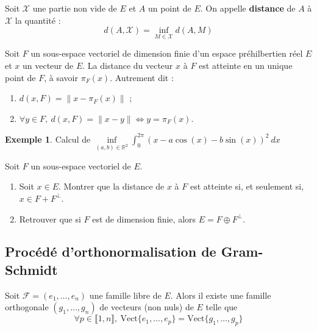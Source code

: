 \documentclass[french]{article}
\newcommand{\R}{\mathbb{R}}
\theoremstyle{plain}
\theoremstyle{definition}
\newtheorem*{ex}{Exemple}
\theoremstyle{remark}
\begin{document}
\begin{dfn}
	Soit $\mathcal{X}$ une partie non vide de $E$ et $A$ un point de $E$. On appelle \textbf{distance} de $A$ à $\mathcal{X}$ la quantité : $$d(A,\mathcal{X})=\underset{M\in\mathcal{X}}{\inf}d(A,M)$$
\end{dfn}

\begin{thm}
	Soit $F$ un sous-espace vectoriel de dimension finie d'un espace préhilbertien réel $E$ et $x$ un vecteur de $E$. La distance du vecteur $x$ à $F$ est atteinte en un unique point de $F$, à savoir $\pi_F(x)$. Autrement dit : 
	\begin{enumerate}
		\item $d(x,F)=\lVert x-\pi_F(x)\rVert$ ;
		\item $\forall y\in F,\ d(x,F)=\lVert x-y\rVert\iff y=\pi_F(x)$.
	\end{enumerate}
\end{thm}

\begin{ex}
	Calcul de $\displaystyle\underset{(a,b)\in\R^2}{\inf}\int_{0}^{2\pi}(x-a\cos(x)-b\sin(x))^2\ dx$
\end{ex}

\begin{exo}
	Soit $F$ un sous-espace vectoriel de $E$.
	\begin{enumerate}
		\item Soit $x\in E$. Montrer que la distance de $x$ à $F$ est atteinte si, et seulement si, $x\in F+F^\bot$.
		\item Retrouver que si $F$ est de dimension finie, alors $E=F\oplus F^\bot$.
	\end{enumerate}
\end{exo}

\subsection{Procédé d'orthonormalisation de Gram-Schmidt}

\begin{thm}
	Soit $\mathcal{F}=(e_1,\ldots,e_n)$ une famille libre de $E$. Alors il existe une famille orthogonale $(g_1,\ldots,g_n)$ de vecteurs (non nuls) de $E$ telle que $$\forall p\in\llbracket 1,n\rrbracket,\ \text{Vect}\{e_1,\ldots,e_p\}=\text{Vect}\{g_1,\ldots,g_p\}$$
\end{thm}
\end{document}
